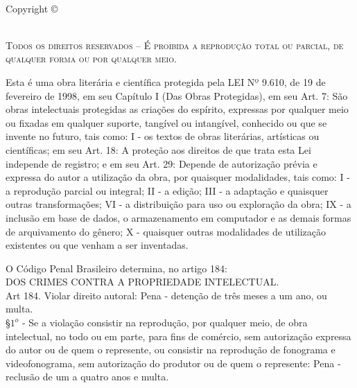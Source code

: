
\newpage
~\vfill
\thispagestyle{empty}

\noindent Copyright \copyright\ \anolongo\ \nomeautor


\noindent {\websiteautor}\\ %

\noindent \textsc{Todos os direitos reservados -- É proibida a reprodução total ou parcial, de qualquer forma ou por qualquer meio.}

\noindent \small{Esta é uma obra literária e científica protegida pela LEI Nº 9.610, de 19 de fevereiro de 1998, em seu Capítulo I (Das Obras Protegidas), em seu Art. 7: São obras intelectuais protegidas as criações do espírito, expressas por qualquer meio ou fixadas em qualquer suporte, tangível ou intangível, conhecido ou que se invente no futuro, tais como: I - os textos de obras literárias, artísticas ou científicas; em seu Art. 18: A proteção aos direitos de que trata esta Lei independe de registro; e em seu Art. 29: Depende de autorização prévia e expressa do autor a utilização da obra, por quaisquer modalidades, tais como: I - a reprodução parcial ou integral; II - a edição; III - a adaptação e quaisquer outras transformações; VI - a distribuição para uso ou exploração da obra; IX - a inclusão em base de dados, o armazenamento em computador e as demais formas de arquivamento do gênero; X - quaisquer outras modalidades de utilização existentes ou que venham a ser inventadas.}

\noindent \small{O Código Penal Brasileiro determina, no artigo 184:\\
    DOS CRIMES CONTRA A PROPRIEDADE INTELECTUAL. \\
    Art 184. Violar direito autoral: Pena - detenção de três meses a um ano, ou multa.\\
    \S $1^o$ - Se a violação consistir na reprodução, por qualquer meio, de obra intelectual, no todo ou em parte, para fins de comércio, sem autorização expressa do autor ou de quem o represente, ou consistir na reprodução de fonograma e videofonograma, sem autorização do produtor ou de quem o represente: Pena - reclusão de um a quatro anos e multa.}

